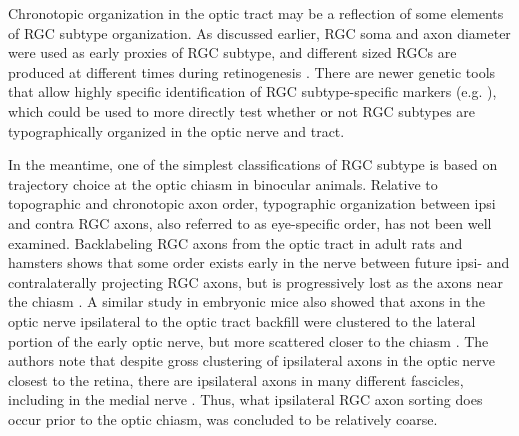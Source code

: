 Chronotopic organization in the optic tract may be a reflection of some elements of RGC subtype organization.
As discussed earlier, RGC soma and axon diameter were used as early proxies of RGC subtype, and different sized RGCs are produced at different times during retinogenesis \cite{rapaport1995spatiotemporal,reese1994birthdates}.
There are newer genetic tools that allow highly specific identification of RGC subtype-specific markers (e.g. \cite{blackshaw2004genomic,dhande2014retinal,baden2016functional,rivlin2011transgenic}), which could be used to more directly test whether or not RGC subtypes are typographically organized in the optic nerve and tract.%

In the meantime, one of the simplest classifications of RGC subtype is based on trajectory choice at the optic chiasm in binocular animals.
Relative to topographic and chronotopic axon order, typographic organization between ipsi and contra RGC axons, also referred to as eye-specific order, has not been well examined.
Backlabeling RGC axons from the optic tract in adult rats and hamsters shows that some order exists early in the nerve between future ipsi- and contralaterally projecting RGC axons, but is progressively lost as the axons near the chiasm \cite{baker1989distribution}.
A similar study in embryonic mice also showed that axons in the optic nerve ipsilateral to the optic tract backfill were clustered to the lateral portion of the early optic nerve, but more scattered closer to the chiasm \cite{colello1990early}.
The authors note that despite gross clustering of ipsilateral axons in the optic nerve closest to the retina, there are ipsilateral axons in many different fascicles, including in the medial nerve \cite{colello1990early}.
Thus, what ipsilateral RGC axon sorting does occur prior to the optic chiasm, was concluded to be relatively coarse.

